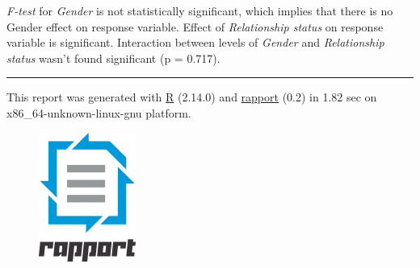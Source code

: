 \documentclass[]{article}
\makeatletter
\def\maxwidth{\ifdim\Gin@nat@width>\linewidth\linewidth
\else\Gin@nat@width\fi}
\let\Oldincludegraphics\includegraphics
\renewcommand{\includegraphics}[1]{\Oldincludegraphics[width=\maxwidth]{#1}}
\makeatother
\begin{document}
\emph{F-test} for \emph{Gender} is not statistically significant, which
implies that there is no Gender effect on response variable. Effect of
\emph{Relationship status} on response variable is significant.
Interaction between levels of \emph{Gender} and \emph{Relationship
status} wasn't found significant (p = 0.717).

\begin{center}\rule{3in}{0.4pt}\end{center}

This report was generated with \href{http://www.r-project.org/}{R}
(2.14.0) and \href{http://al3xa.github.com/rapport/}{rapport} (0.2) in
1.82 sec on x86\_64-unknown-linux-gnu platform.

\begin{figure}[htbp]
\centering
\includegraphics{images/logo.png}
\caption{}
\end{figure}
\end{document}
